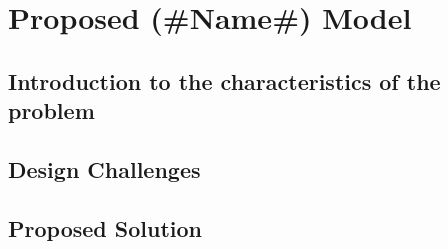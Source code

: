 \documentclass[../Report.tex]{subfiles}
\begin{document}
\chapter{Proposed (\#Name\#) Model}

\section{Introduction to the characteristics of the problem}

\section{Design Challenges}

\section{Proposed Solution}
\end{document}
